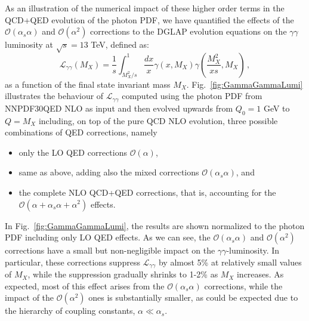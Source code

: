 As an illustration of the numerical impact of these higher
order terms in the QCD+QED evolution of the photon PDF,
we have quantified the effects of the
$\mathcal{O}(\alpha_s\alpha)$ and $\mathcal{O}(\alpha^2)$ corrections
to the DGLAP evolution equations on the $\gamma\gamma$ luminosity at
$\sqrt{s} = 13$ TeV, defined as:
\begin{equation}\label{eq:GammaGammaLumi}
\mathcal{L}_{\gamma\gamma}(M_X) = \frac1{s}\int_{M_X^2/s}^1
\frac{dx}{x} \gamma(x,M_X) \gamma\left(\frac{M_X^2}{xs},M_X\right)\,,
\end{equation}
as a function of the final state invariant mass $M_X$.
%
Fig.~\ref{fig:GammaGammaLumi} illustrates the behaviour of
$\mathcal{L}_{\gamma\gamma}$ computed using the photon PDF
from NNPDF30QED NLO as input and then 
 evolved upwards from $Q_0 = 1$ GeV to
$Q=M_X$ including, on top of the pure QCD NLO evolution, three
possible combinations of QED corrections, namely
\begin{itemize}
\item only the LO QED
corrections $\mathcal{O}(\alpha)$, 
\item same as above, adding also the mixed
corrections $\mathcal{O}(\alpha_s\alpha)$, and
\item the complete NLO
QCD+QED corrections, that is, accounting for the
$\mathcal{O}(\alpha+\alpha_s\alpha+\alpha^2)$
effects.
\end{itemize}
In Fig.~\ref{fig:GammaGammaLumi}, the results are shown
normalized to the photon PDF including only LO QED effects.
%
As we can see, the
$\mathcal{O}(\alpha_s\alpha)$ and $\mathcal{O}(\alpha^2)$ corrections
have a small but non-negligible impact on the
$\gamma\gamma$-luminosity. In particular, these corrections suppress
$\mathcal{L}_{\gamma\gamma}$ by almost 5\% at relatively small values of
$M_X$, while the suppression gradually shrinks to 1-2\% as $M_X$
increases. As expected, most of this effect arises from the
$\mathcal{O}(\alpha_s\alpha)$ corrections, while the impact
of the 
$\mathcal{O}(\alpha^2)$ ones is substantially smaller, as could
be expected due to the
hierarchy of coupling constants, $\alpha \ll \alpha_s$.


